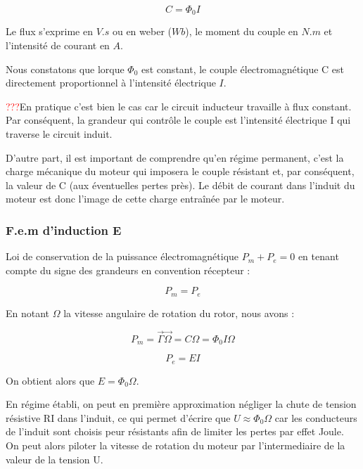 \documentclass{article}
\begin{document}
\begin{equation}
    C = \Phi_0 I
\end{equation}

Le flux s'exprime en $V.s$ ou en weber ($Wb$), le moment du couple en $N.m$ et l'intensité de courant en $A$.\medskip

Nous constatons que lorque $\Phi_0$ est constant, le couple électromagnétique C est directement proportionnel à l'intensité électrique $I$. \medskip

\textcolor{red}{???}En pratique c'est bien le cas car le circuit inducteur travaille à flux constant. Par conséquent, la grandeur qui contrôle le couple est l'intensité électrique I qui traverse le circuit induit.\medskip

D'autre part, il est important de comprendre qu'en régime permanent, c'est la charge mécanique du moteur qui imposera le couple résistant et, par conséquent, la valeur de C (aux éventuelles pertes près). Le débit de courant dans l'induit du moteur est donc l'image de cette charge entraînée par le moteur.


\subsubsection{F.e.m d'induction E}

Loi de conservation de la puissance électromagnétique $P_m + P_e =0$ en tenant compte du signe des grandeurs en convention récepteur :

\begin{equation}
    P_m = P_e
\end{equation}

En notant $\Omega$ la vitesse angulaire de rotation du rotor, nous avons :

\begin{equation}
    P_m = \vec{\Gamma}\vec{\Omega}= C \Omega = \Phi_0 I \Omega
\end{equation}

\begin{equation}
    P_e = EI
\end{equation}

On obtient alors que $E= \Phi_0 \Omega$. \medskip

En régime établi, on peut en première approximation négliger la chute de tension résistive RI dans l'induit, ce qui permet d'écrire que $U \approx \Phi_0 \Omega$ car les conducteurs de l'induit sont choisis peur résistants afin de limiter les pertes par effet Joule. On peut alors piloter la vitesse de rotation du moteur par l'intermediaire de la valeur de la tension U.
\end{document}
